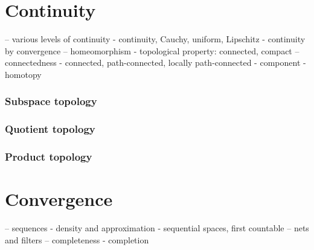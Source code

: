 \documentclass{../crs}
\begin{document}
\chapter{Continuity}
-- various levels of continuity
- continuity, Cauchy, uniform, Lipschitz
- continuity by convergence
-- homeomorphism
- topological property: connected, compact
-- connectedness
- connected, path-connected, locally path-connected
- component
- homotopy



\subsection{Subspace topology}

\subsection{Quotient topology}

\subsection{Product topology}












\chapter{Convergence}
-- sequences
- density and approximation
- sequential spaces, first countable
-- nets and filters
-- completeness
- completion
\end{document}
